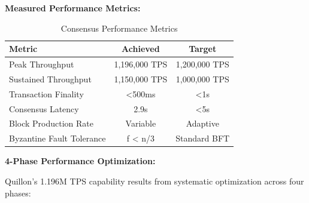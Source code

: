 \documentclass[11pt,a4paper]{scrartcl}
\begin{document}
\textbf{Measured Performance Metrics:}

\begin{table}[h]
\centering
\begin{tabular}{lcc}
\toprule
\textbf{Metric} & \textbf{Achieved} & \textbf{Target} \\
\midrule
Peak Throughput & 1,196,000 TPS & 1,200,000 TPS \\
Sustained Throughput & 1,150,000 TPS & 1,000,000 TPS \\
Transaction Finality & <500ms & <1s \\
Consensus Latency & 2.9s & <5s \\
Block Production Rate & Variable & Adaptive \\
Byzantine Fault Tolerance & f < n/3 & Standard BFT \\
\bottomrule
\end{tabular}
\caption{Consensus Performance Metrics}
\end{table}

\textbf{4-Phase Performance Optimization:}

Quillon's 1.196M TPS capability results from systematic optimization across four phases:
\end{document}

